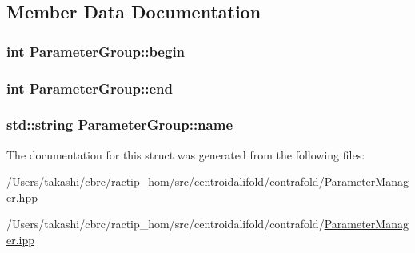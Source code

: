\subsection{Member Data Documentation}
\hypertarget{struct_parameter_group_a269c5b3ee686ccda81e6cbe70e1932bc}{
\subsubsection[{begin}]{\setlength{\rightskip}{0pt plus 5cm}int Parameter\+Group\+::begin}}\label{struct_parameter_group_a269c5b3ee686ccda81e6cbe70e1932bc}
\hypertarget{struct_parameter_group_adc97d1628d57d1e23c7a047b57087916}{
\subsubsection[{end}]{\setlength{\rightskip}{0pt plus 5cm}int Parameter\+Group\+::end}}\label{struct_parameter_group_adc97d1628d57d1e23c7a047b57087916}
\hypertarget{struct_parameter_group_a1c2c9357e7746d424afbd4361d0bc668}{
\subsubsection[{name}]{\setlength{\rightskip}{0pt plus 5cm}std\+::string Parameter\+Group\+::name}}\label{struct_parameter_group_a1c2c9357e7746d424afbd4361d0bc668}


The documentation for this struct was generated from the following files\+:\begin{DoxyCompactItemize}
\item 
/\+Users/takashi/cbrc/ractip\+\_\+hom/src/centroidalifold/contrafold/\hyperlink{centroidalifold_2contrafold_2_parameter_manager_8hpp}{Parameter\+Manager.\+hpp}\item 
/\+Users/takashi/cbrc/ractip\+\_\+hom/src/centroidalifold/contrafold/\hyperlink{centroidalifold_2contrafold_2_parameter_manager_8ipp}{Parameter\+Manager.\+ipp}\end{DoxyCompactItemize}

